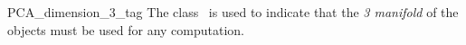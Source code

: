 
\begin{ccRefClass}{PCA_dimension_3_tag}  
\ccDefinition
The class \ccRefName\ is used to indicate that the \textit{3 manifold} of the objects must be used for any computation.



\end{ccRefClass}
